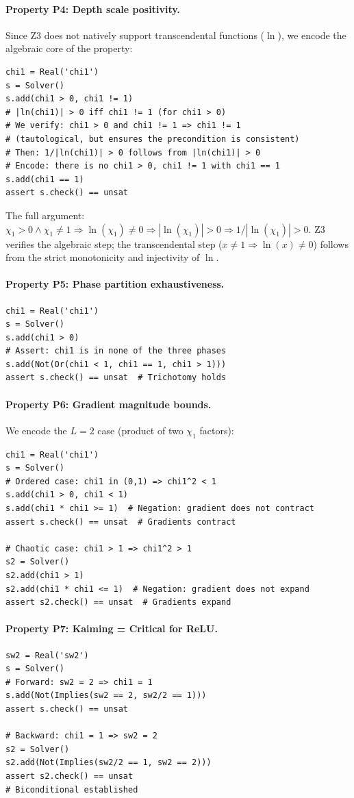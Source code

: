 \documentclass[10pt]{article}
\begin{document}
\paragraph{Property P4: Depth scale positivity.}
Since Z3 does not natively support transcendental functions ($\ln$), we encode the algebraic core of the property:
\begin{verbatim}
chi1 = Real('chi1')
s = Solver()
s.add(chi1 > 0, chi1 != 1)
# |ln(chi1)| > 0 iff chi1 != 1 (for chi1 > 0)
# We verify: chi1 > 0 and chi1 != 1 => chi1 != 1
# (tautological, but ensures the precondition is consistent)
# Then: 1/|ln(chi1)| > 0 follows from |ln(chi1)| > 0
# Encode: there is no chi1 > 0, chi1 != 1 with chi1 == 1
s.add(chi1 == 1)
assert s.check() == unsat
\end{verbatim}
The full argument: $\chi_1 > 0 \wedge \chi_1 \neq 1 \Rightarrow \ln(\chi_1) \neq 0 \Rightarrow |\ln(\chi_1)| > 0 \Rightarrow 1/|\ln(\chi_1)| > 0$.
Z3 verifies the algebraic step; the transcendental step ($x \neq 1 \Rightarrow \ln(x) \neq 0$) follows from the strict monotonicity and injectivity of $\ln$.

\paragraph{Property P5: Phase partition exhaustiveness.}
\begin{verbatim}
chi1 = Real('chi1')
s = Solver()
s.add(chi1 > 0)
# Assert: chi1 is in none of the three phases
s.add(Not(Or(chi1 < 1, chi1 == 1, chi1 > 1)))
assert s.check() == unsat  # Trichotomy holds
\end{verbatim}

\paragraph{Property P6: Gradient magnitude bounds.}
We encode the $L=2$ case (product of two $\chi_1$ factors):
\begin{verbatim}
chi1 = Real('chi1')
s = Solver()
# Ordered case: chi1 in (0,1) => chi1^2 < 1
s.add(chi1 > 0, chi1 < 1)
s.add(chi1 * chi1 >= 1)  # Negation: gradient does not contract
assert s.check() == unsat  # Gradients contract

# Chaotic case: chi1 > 1 => chi1^2 > 1
s2 = Solver()
s2.add(chi1 > 1)
s2.add(chi1 * chi1 <= 1)  # Negation: gradient does not expand
assert s2.check() == unsat  # Gradients expand
\end{verbatim}

\paragraph{Property P7: Kaiming = Critical for ReLU.}
\begin{verbatim}
sw2 = Real('sw2')
s = Solver()
# Forward: sw2 = 2 => chi1 = 1
s.add(Not(Implies(sw2 == 2, sw2/2 == 1)))
assert s.check() == unsat

# Backward: chi1 = 1 => sw2 = 2
s2 = Solver()
s2.add(Not(Implies(sw2/2 == 1, sw2 == 2)))
assert s2.check() == unsat
# Biconditional established
\end{verbatim}
\end{document}
